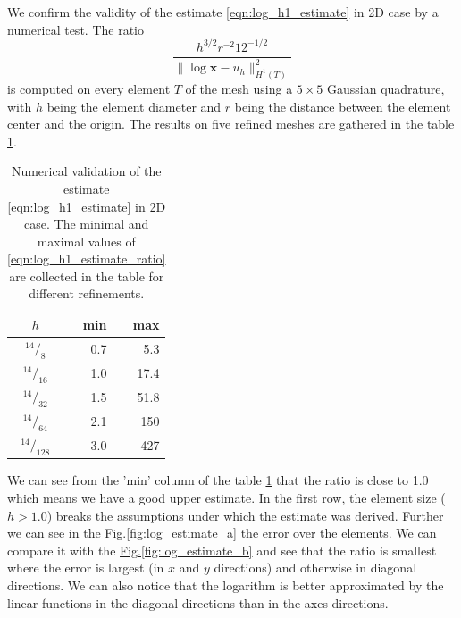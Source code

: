 \documentclass[preprint,12pt]{elsarticle}
\newcommand{\fig}[1]{\hyperref[#1]{Fig.\ref{#1}}}
\def\vc#1{\mathbf{\boldsymbol{#1}}}     %
\newcommand*\rfrac[2]{{}^{#1}\!/_{#2}}
\begin{document}
We confirm the validity of the estimate \eqref{eqn:log_h1_estimate} in 2D case by a numerical test.
The ratio 
\begin{equation} \label{eqn:log_h1_estimate_ratio}
\frac{h^{3/2} r^{-2} 12^{-1/2}}{\|\log \vc x - u_h\|^2_{H^1(T)}}
\end{equation}
is computed on every element $T$ of the mesh using a $5\times5$ Gaussian quadrature, with $h$ being the 
element diameter and $r$ being the distance between the element center and the origin. The results on five
refined meshes are gathered in the table \ref{tab:log_h1_estimate}. 
%
\begin{table}
\begin{center}
\begin{tabular}{crr}
\toprule
$h$    & min & max \\
\midrule
$\rfrac{14}{8}$    & 0.7 & 5.3   \\
$\rfrac{14}{16}$   & 1.0 & 17.4  \\
$\rfrac{14}{32}$   & 1.5 & 51.8  \\
$\rfrac{14}{64}$   & 2.1 & 150   \\
$\rfrac{14}{128}$  & 3.0 & 427   \\
\bottomrule
\end{tabular}
\caption{Numerical validation of the estimate \eqref{eqn:log_h1_estimate} in 2D case. The minimal and maximal 
values of \eqref{eqn:log_h1_estimate_ratio} are collected in the table for different refinements.}
\label{tab:log_h1_estimate}
\end{center}
\end{table}
%
We can see from the 'min' column of the table \ref{tab:log_h1_estimate} that the ratio is close to 1.0 which means we
have a good upper estimate. In the first row, the element size ($h>1.0$) breaks the assumptions under which the 
estimate was derived. Further we can see in the \fig{fig:log_estimate_a} the error over the elements. We can 
compare it with the \fig{fig:log_estimate_b} and see that the ratio is smallest where the error is largest 
(in $x$ and $y$ directions) and otherwise in diagonal directions. We can also notice that the logarithm is 
better approximated by the linear functions in the diagonal directions than in the axes directions.
\end{document}
